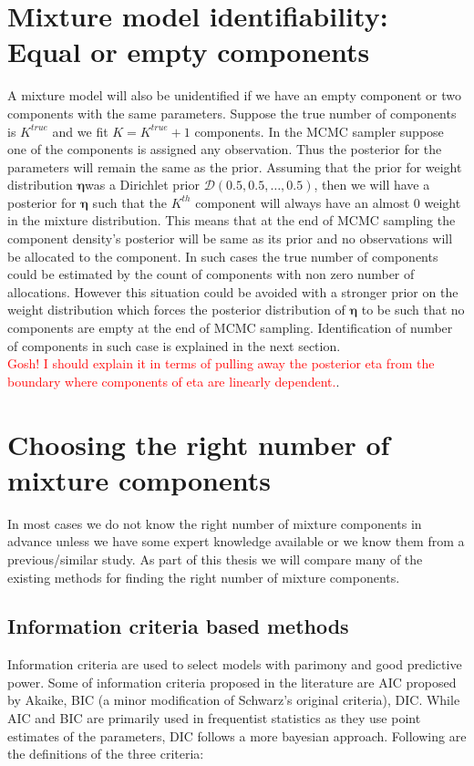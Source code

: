 \section{Mixture model identifiability: Equal or empty components}
A mixture model will also be unidentified if we have an empty component or two components with the same parameters. Suppose the true number of components is $K^{true}$ and we fit $K = K^{true} + 1$ components. In the MCMC sampler suppose one of the components is assigned any observation. Thus the posterior for the parameters will remain the same as the prior. Assuming that the prior for weight distribution $\boldsymbol{\eta}$was a Dirichlet prior $\mathcal{D}(0.5, 0.5, \ldots, 0.5)$, then we will have a posterior for $\boldsymbol{\eta}$ such that the $K^{th}$ component will always have an almost 0 weight in the mixture distribution. This means that at the end of MCMC sampling the component density's posterior will be same as its prior and no observations will be allocated to the component. In such cases the true number of components could be estimated by the count of components with non zero number of allocations. However this situation could be avoided with a stronger prior on the weight distribution which forces the posterior distribution of $\boldsymbol{\eta}$ to be such that no components are empty at the end of MCMC sampling. Identification of number of components in such case is explained in the next section.\\

\textcolor{red}{Gosh! I should explain it in terms of pulling away the posterior eta from the boundary where components of eta are linearly dependent.}. 


\section{Choosing the right number of mixture components}
In most cases we do not know the right number of mixture components in advance unless we have some expert knowledge available or we know them from a previous/similar study. As part of this thesis we will compare many of the existing methods for finding the right number of mixture components.\\

\subsection{Information criteria based methods}
Information criteria are used to select models with parimony and good predictive power. Some of information criteria proposed in the literature are AIC proposed by Akaike, BIC (a minor modification of Schwarz's original criteria), DIC. While AIC and BIC are primarily used in frequentist statistics as they use point estimates of the parameters, DIC follows a more bayesian approach. Following are the definitions of the three criteria:\\

